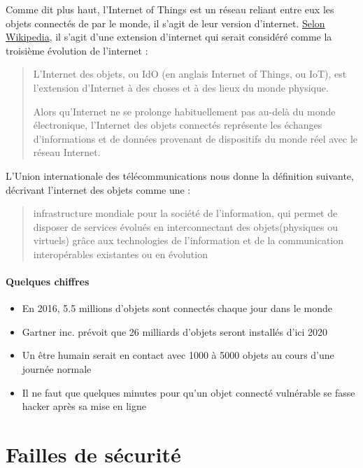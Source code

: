 \documentclass[a4paper]{report}
\begin{document}
	Comme dit plus haut, l'Internet of Things est un réseau reliant entre eux les objets connectés de par le monde, il s'agit de leur version
	d'internet. \href{https://fr.wikipedia.org/wiki/Internet_des_objets}{Selon Wikipedia}, il s'agit d'une extension d'internet qui serait
	considéré comme la troisième évolution de l'internet :
	\smallbreak
	\begin{quotation}
		L'Internet des objets, ou IdO (en anglais Internet of Things, ou IoT), est l'extension d'Internet à des choses et à des lieux du monde
		physique.

		Alors qu'Internet ne se prolonge habituellement pas au-delà du monde électronique, l'Internet des objets connectés représente les
		échanges d'informations et de données provenant de dispositifs du monde réel avec le réseau Internet.
	\end{quotation}
	
	\bigbreak
	
	L'Union internationale des télécommunications nous donne la définition suivante, décrivant l'internet des objets comme une :
	\begin{quotation}
		infrastructure mondiale pour la société de l'information, qui permet de disposer de services évolués en interconnectant 
		des objets(physiques ou virtuels) grâce aux technologies de l'information et de la communication interopérables existantes 
		ou en évolution
	\end{quotation}
	
	\medbreak	
	
	\paragraph{Quelques chiffres}
	\begin{itemize}
		\item En 2016, 5.5 millions d'objets sont connectés chaque jour dans le monde
		\item Gartner inc. prévoit que 26 milliards d'objets seront installés d'ici 2020
		\item Un être humain serait en contact avec 1000 à 5000 objets au cours d'une journée normale
		\item Il ne faut que quelques minutes pour qu'un objet connecté vulnérable se fasse hacker après sa mise en ligne
	\end{itemize}
	
	\newpage	
	
	\section{Failles de sécurité}
\end{document}
